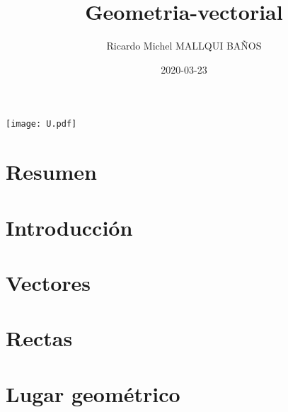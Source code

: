 \documentclass[10pt,]{krantz}
\title{Geometria-vectorial}
\author{Ricardo Michel MALLQUI BAÑOS}
\institute{Universidad Nacional San Cristóbal De Huamanga}
\date{2020-03-23}
\theoremstyle{definition}
\theoremstyle{definition}
\theoremstyle{definition}
\theoremstyle{remark}
\begin{document}
\maketitle

\thispagestyle{empty}
\begin{center}
\texttt{[image: U.pdf]}
\end{center}


{
\hypersetup{linkcolor=}
\setcounter{tocdepth}{2}
\tableofcontents
}
\listoftables
\listoffigures
\newcommand{\N}{\mathbb{N}}
\newcommand{\R}{\mathbb{R}}
\newcommand{\CC}{\mathbb{C}}
\newcommand{\I}{\mathbb{I}}
\newcommand{\f}{\mathbb{f}}
\newcommand{\X}{\mathbb{X}}
\newcommand{\D}{\mathbb{D}}
\newcommand{\Z}{\mathbb{Z}}
\newcommand{\Q}{\mathbb{Q}}
\newcommand{\norm}[1]{\left\Vert#1\right\Vert}
\newcommand{\abs}[1]{\left\vert#1\right\vert}
\newcommand{\set}[1]{\left\{#1\right\}}
\newcommand{\seq}[1]{\left<#1\right>}
\newcommand{\co}[1]{\left[#1\right]}
\newcommand{\cc}[1]{\left(#1\right)}
\newcommand{\J}{\mathcal{J}}
\newcommand{\K}{\mathcal{K}}
\newcommand{\M}{\mathcal{M}}
\newcommand{\F}{\mathcal{F}}

\hypertarget{resumen}{%
\chapter*{Resumen}\label{resumen}}


\hypertarget{introducciuxf3n}{%
\chapter*{Introducción}\label{introducciuxf3n}}


\mainmatter

\hypertarget{vectores}{%
\chapter{Vectores}\label{vectores}}

\hypertarget{intro}{%
\chapter{Rectas}\label{intro}}

\hypertarget{lugar-geomuxe9trico}{%
\chapter{Lugar geométrico}\label{lugar-geomuxe9trico}}
\end{document}
